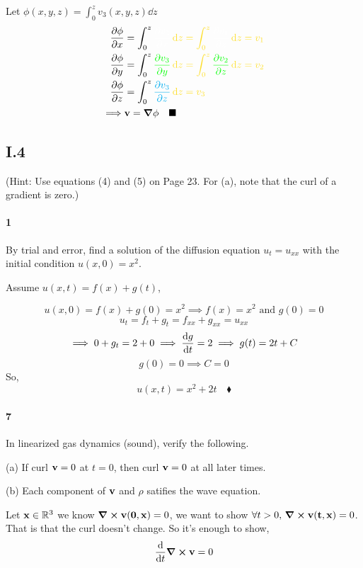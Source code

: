 \documentclass{article}
\newcommand\R{\mathbb{R}}
\begin{document}
Let $\phi(x,y,z) =\int_0^z v_3(x,y,z) \dd{z}$
\begin{align*}
  \pdv{\phi}{x}  &= \int_0^z \color{White}
                   \pdv{v_3}{x}\color{Goldenrod}\dd{z}
                   = \int_0^z \color{White}
                   \pdv{v_1}{z}\color{Goldenrod}\dd{z} = v_1\\
  \pdv{\phi}{y}  &= \int_0^z \color{green}
                   \pdv{v_3}{y}\color{Goldenrod}\dd{z}
                   = \int_0^z \color{green}
                   \pdv{v_2}{z}\color{Goldenrod}\dd{z} = v_2\\
  \pdv{\phi}{z}  &= \int_0^z \color{cyan}
                   \pdv{v_3}{z}\color{Goldenrod}\dd{z}
                   = v_3\\
  \implies& \vb{v} = \grad{\phi} \quad \blacksquare
\end{align*}
\subsection*{I.4} (Hint: Use equations (4) and (5) on Page 23. For (a), note that the curl of a gradient is
zero.)
\paragraph{1}By trial and error, find a solution of the diffusion equation $u_t = u_{x x}$ with
the initial condition $u(x, 0) = x^2$.


Assume $u(x,t) = f(x) + g(t)$,

\[u(x,0) = f(x) +g(0) = x^2 \implies f(x) = x^2\text{ and
  }g(0) = 0\]
\[u_t = f_t+g_t = f_{xx} +g_{xx} = u_{xx}\]
\[ \implies 0 + g_t = 2  +0  \implies \dv{g}{t} = 2 \implies g(t) = 2t + C \]
\[g(0)=0 \implies C = 0\]
So, \[u(x,t) = x^2 +2t\quad \blacklozenge\]
\paragraph{7} In linearized gas dynamics (sound), verify the following.

(a) If curl $\bold{v} = 0$ at $t = 0$, then curl $\bold{v} = 0$ at all later times.

(b) Each component of $\vb{v}$ and $ρ$ satifies the wave equation.


Let $\vb{x}\in \R^3$ we know $\curl{\vb{v(0,\vb{x})}} = 0$, we want to
show $\forall t> 0,\, \curl{\vb{v(t,\vb{x})}} = 0$. That is that the
curl doesn't change. So it's enough to show,
\[\dv{t}\curl{\vb{v}}=0\]
\end{document}
